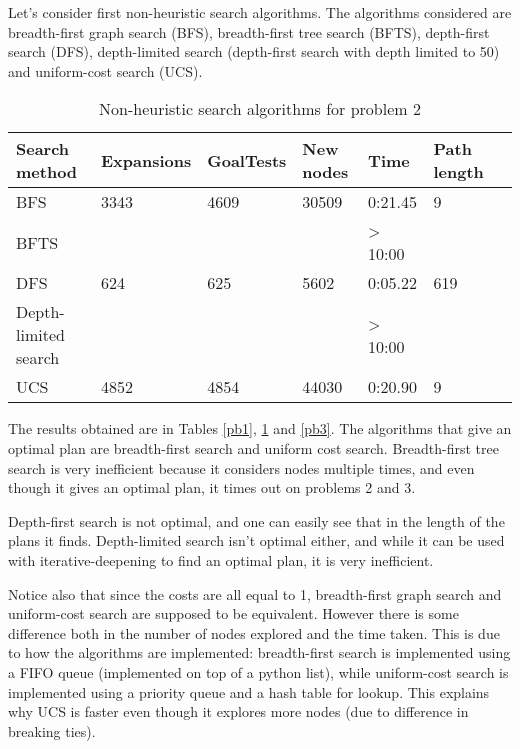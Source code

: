 \documentclass[11pt]{article}
\begin{document}
Let's consider first non-heuristic search algorithms. The algorithms considered are breadth-first graph search (BFS), breadth-first tree search (BFTS), depth-first search (DFS), depth-limited search (depth-first search with depth limited to 50) and uniform-cost search (UCS).

\begin{table}[h]
\begin{center}
\begin{tabular}{|l|l|l|l|l|l|l|}
  \hline
  Search method & Expansions & GoalTests & New nodes & Time    & Path length\\
  \hline
  BFS           & 3343       & 4609      & 30509     & 0:21.45 & 9     \\
  \hline
  BFTS          &            &           &           & > 10:00 &       \\
  \hline
  DFS           & 624        & 625       & 5602      & 0:05.22 & 619   \\
  \hline
  Depth-limited search &     &           &           & > 10:00 &       \\
  \hline
  UCS           & 4852       & 4854      & 44030     & 0:20.90 & 9     \\
  \hline
\end{tabular}
\caption{Non-heuristic search algorithms for problem 2} \label{pb2}
\end{center}
\end{table}

The results obtained are in Tables \ref{pb1}, \ref{pb2} and \ref{pb3}. The algorithms that give an optimal plan are breadth-first search and uniform cost search. Breadth-first tree search is very inefficient because it considers nodes multiple times, and even though it gives an optimal plan, it times out on problems 2 and 3.

Depth-first search is not optimal, and one can easily see that in the length of the plans it finds. Depth-limited search isn't optimal either, and while it can be used with iterative-deepening to find an optimal plan, it is very inefficient.

Notice also that since the costs are all equal to 1, breadth-first graph search and uniform-cost search are supposed to be equivalent. However there is some difference both in the number of nodes explored and the time taken. This is due to how the algorithms are implemented: breadth-first search is implemented using a FIFO queue (implemented on top of a python list), while uniform-cost search is implemented using a priority queue and a hash table for lookup. This explains why UCS is faster even though it explores more nodes (due to difference in breaking ties).
\end{document}
